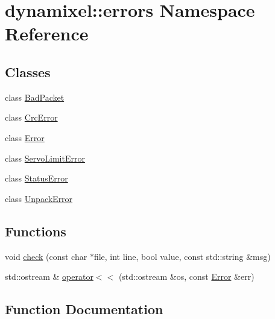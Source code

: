 \hypertarget{namespacedynamixel_1_1errors}{}\section{dynamixel\+:\+:errors Namespace Reference}
\label{namespacedynamixel_1_1errors}
\subsection*{Classes}
\begin{DoxyCompactItemize}
\item 
class \hyperlink{classdynamixel_1_1errors_1_1_bad_packet}{Bad\+Packet}
\item 
class \hyperlink{classdynamixel_1_1errors_1_1_crc_error}{Crc\+Error}
\item 
class \hyperlink{classdynamixel_1_1errors_1_1_error}{Error}
\item 
class \hyperlink{classdynamixel_1_1errors_1_1_servo_limit_error}{Servo\+Limit\+Error}
\item 
class \hyperlink{classdynamixel_1_1errors_1_1_status_error}{Status\+Error}
\item 
class \hyperlink{classdynamixel_1_1errors_1_1_unpack_error}{Unpack\+Error}
\end{DoxyCompactItemize}
\subsection*{Functions}
\begin{DoxyCompactItemize}
\item 
void \hyperlink{namespacedynamixel_1_1errors_a8ce9eb21754f795d22794487c25d0b2d}{check} (const char $\ast$file, int line, bool value, const std\+::string \&msg)
\item 
std\+::ostream \& \hyperlink{namespacedynamixel_1_1errors_a214a77c7d6b433bdfe2ad7beec08d7f8}{operator$<$$<$} (std\+::ostream \&os, const \hyperlink{classdynamixel_1_1errors_1_1_error}{Error} \&err)
\end{DoxyCompactItemize}


\subsection{Function Documentation}
\hypertarget{namespacedynamixel_1_1errors_a8ce9eb21754f795d22794487c25d0b2d}{}
